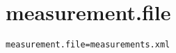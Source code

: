 \section{measurement.file}
\label{configuration:MeasurementFile}
\AvailableInJavaOnly{\TODO}
\begin{lstlisting}[style=Props,caption={Usage example for \textit{measurement.file}}]
measurement.file=measurements.xml
\end{lstlisting}